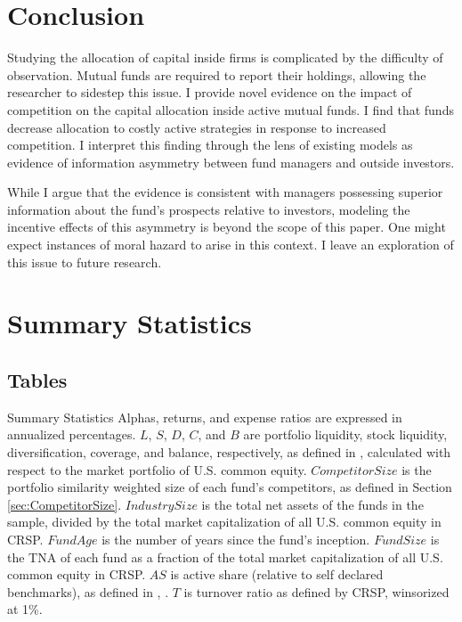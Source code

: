 \documentclass[]{book}
\theoremstyle{definition}
\theoremstyle{definition}
\theoremstyle{definition}
\theoremstyle{remark}
\begin{document}
\hypertarget{sec:conclusion}{%
\chapter{Conclusion}\label{sec:conclusion}}

Studying the allocation of capital inside firms is complicated by the
difficulty of observation. Mutual funds are required to report their
holdings, allowing the researcher to sidestep this issue. I provide
novel evidence on the impact of competition on the capital allocation
inside active mutual funds. I find that funds decrease allocation to
costly active strategies in response to increased competition. I
interpret this finding through the lens of existing models as evidence
of information asymmetry between fund managers and outside investors.

While I argue that the evidence is consistent with managers possessing
superior information about the fund's prospects relative to investors,
modeling the incentive effects of this asymmetry is beyond the scope of
this paper. One might expect instances of moral hazard to arise in this
context. I leave an exploration of this issue to future research.

\hypertarget{refs}{}

\hypertarget{appendix-appendix}{%
\appendix}


\hypertarget{summary-statistics}{%
\chapter{Summary Statistics}\label{summary-statistics}}

\hypertarget{tables}{%
\section{Tables}\label{tables}}

\label{tab:sumStats}Summary Statistics Alphas, returns, and expense ratios
are expressed in annualized percentages. \(L\), \(S\), \(D\), \(C\), and
\(B\) are portfolio liquidity, stock liquidity, diversification,
coverage, and balance, respectively, as defined in \citet{pst17L},
calculated with respect to the market portfolio of U.S. common equity.
\(CompetitorSize\) is the portfolio similarity weighted size of each
fund's competitors, as defined in Section \ref{sec:CompetitorSize}.
\(IndustrySize\) is the total net assets of the funds in the sample,
divided by the total market capitalization of all U.S. common equity in
CRSP. \(FundAge\) is the number of years since the fund's inception.
\(FundSize\) is the TNA of each fund as a fraction of the total market
capitalization of all U.S. common equity in CRSP. \(AS\) is active share
(relative to self declared benchmarks), as defined in \citet{cp09},
\citet{petajisto13}. \(T\) is turnover ratio as defined by CRSP,
winsorized at 1\%.
\end{document}
